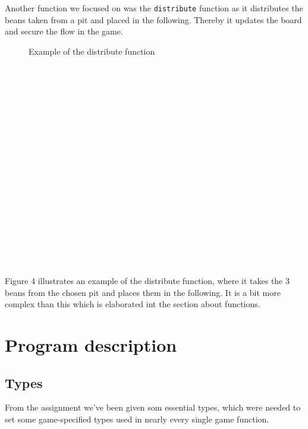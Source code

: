 \documentclass[a4paper]{report}
\begin{document}
Another function we focused on was the \texttt{distribute} 
function as it distributes the beans taken from a pit and placed in the following. Thereby it updates the board and secure the flow in the game.
\begin{figure}
\centering
{}
\caption{Example of the distribute function}
\end{figure}
\\\\
\\\\
\\\\
\\\\
\\\\
\\\\
\\\\
\\\\
\\\\
Figure 4 illustrates an example of the distribute function, where it takes the 3 beans from the chosen pit and places them in the following. It is a bit more complex than this which is elaborated int the section about functions. 

\section*{Program description}
\subsection*{Types}
From the assignment we've been given som essential types, which were needed to set some game-specified types used in nearly every single game function.
\end{document}
